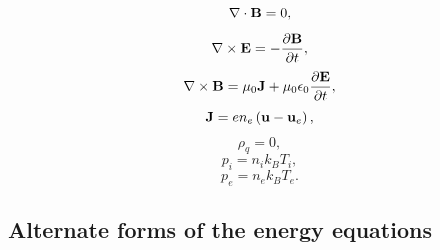 \documentclass[a4paper,11pt]{report}
\begin{document}
\begin{equation}
    \label{eq:sf_1ion_maxwell_4}
    \nabla \cdot \mathbf{B} = 0,
\end{equation}
\begin{equation}
    \label{eq:sf_1ion_maxwell_1}
    \nabla \times \mathbf{E} = -\frac{ \partial \mathbf{B}}{\partial t},
\end{equation}
\begin{equation}
    \label{eq:sf_1ion_maxwell_2}
    \nabla \times \mathbf{B} = \mu_0 \mathbf{J} + \mu_0 \epsilon_0 \frac{\partial \mathbf{E}}{\partial t},
\end{equation}
\begin{equation}
    \label{eq:sf_1ion_curr_density}
    \mathbf{J} = e n_e \left( \mathbf{u} - \mathbf{u}_e \right),
\end{equation}
\begin{equation}
    \label{eq:sf_1ion_mass_density}
    \rho_q = 0,
\end{equation}
\begin{equation}
    \label{eq:sf_1ion_eos_ion}
    p_i = n_i k_B T_i,
\end{equation}
\begin{equation}
    \label{eq:sf_1ion_eos_elec}
    p_e = n_e k_B T_e.
\end{equation}

\subsection{Alternate forms of the energy equations}
\end{document}
